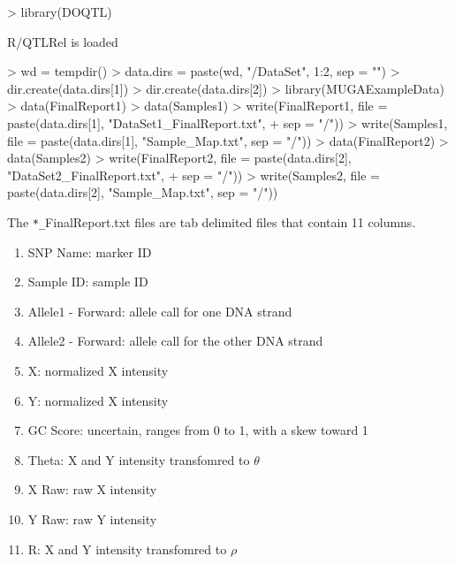 \documentclass{article}
\begin{document}
\begin{Schunk}
\begin{Sinput}
> library(DOQTL)
\end{Sinput}
\begin{Soutput}
R/QTLRel is loaded
\end{Soutput}
\begin{Sinput}
> wd = tempdir()
> data.dirs = paste(wd, "/DataSet", 1:2, sep = "")
> dir.create(data.dirs[1])
> dir.create(data.dirs[2])
> library(MUGAExampleData)
> data(FinalReport1)
> data(Samples1)
> write(FinalReport1, file = paste(data.dirs[1], "DataSet1_FinalReport.txt", 
+                                  sep = "/"))
> write(Samples1, file = paste(data.dirs[1], "Sample_Map.txt", sep = "/"))
> data(FinalReport2)
> data(Samples2)
> write(FinalReport2, file = paste(data.dirs[2], "DataSet2_FinalReport.txt",
+                                 sep = "/"))
> write(Samples2, file = paste(data.dirs[2], "Sample_Map.txt", sep = "/"))
\end{Sinput}
\end{Schunk}

The \verb|*_|FinalReport.txt files are tab delimited files that contain 11 columns.

\begin{enumerate}
  \item{SNP Name: marker ID}
  \item{Sample ID: sample ID}
  \item{Allele1 - Forward: allele call for one DNA strand}
  \item{Allele2 - Forward: allele call for the other DNA strand}
  \item{X: normalized X intensity}
  \item{Y: normalized X intensity}
  \item{GC Score: uncertain, ranges from 0 to 1, with a skew toward 1}
  \item{Theta: X and Y intensity transfomred to $\theta$ }
  \item{X Raw: raw X intensity}
  \item{Y Raw: raw Y intensity}
  \item{R: X and Y intensity transfomred to $\rho$}
\end{enumerate}
\end{document}
